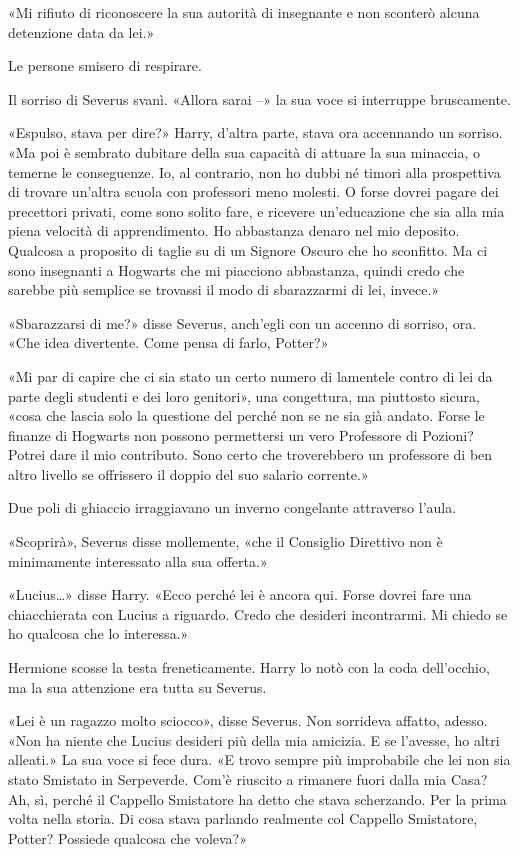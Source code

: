 «Mi rifiuto di riconoscere la sua autorità di insegnante e non sconterò alcuna detenzione data da lei.»

Le persone smisero di respirare.

Il sorriso di Severus svanì. «Allora sarai –» la sua voce si interruppe bruscamente.

«Espulso, stava per dire?» Harry, d’altra parte, stava ora accennando un sorriso. «Ma poi è sembrato dubitare della sua capacità di attuare la sua minaccia, o temerne le conseguenze. Io, al contrario, non ho dubbi né timori alla prospettiva di trovare un’altra scuola con professori meno molesti. O forse dovrei pagare dei precettori privati, come sono solito fare, e ricevere un’educazione che sia alla mia piena velocità di apprendimento. Ho abbastanza denaro nel mio deposito. Qualcosa a proposito di taglie su di un Signore Oscuro che ho sconfitto. Ma ci sono insegnanti a Hogwarts che mi piacciono abbastanza, quindi credo che sarebbe più semplice se trovassi il modo di sbarazzarmi di lei, invece.»

«Sbarazzarsi di me?» disse Severus, anch’egli con un accenno di sorriso, ora. «Che idea divertente. Come pensa di farlo, Potter?»

«Mi par di capire che ci sia stato un certo numero di lamentele contro di lei da parte degli studenti e dei loro genitori», una congettura, ma piuttosto sicura, «cosa che lascia solo la questione del perché non se ne sia già andato. Forse le finanze di Hogwarts non possono permettersi un vero Professore di Pozioni? Potrei dare il mio contributo. Sono certo che troverebbero un professore di ben altro livello se offrissero il doppio del suo salario corrente.»

Due poli di ghiaccio irraggiavano un inverno congelante attraverso l’aula.

«Scoprirà», Severus disse mollemente, «che il Consiglio Direttivo non è minimamente interessato alla sua offerta.»

«Lucius…» disse Harry. «Ecco perché lei è ancora qui. Forse dovrei fare una chiacchierata con Lucius a riguardo. Credo che desideri incontrarmi. Mi chiedo se ho qualcosa che lo interessa.»

Hermione scosse la testa freneticamente. Harry lo notò con la coda dell’occhio, ma la sua attenzione era tutta su Severus.

«Lei è un ragazzo molto sciocco», disse Severus. Non sorrideva affatto, adesso. «Non ha niente che Lucius desideri più della mia amicizia. E se l’avesse, ho altri alleati.» La sua voce si fece dura. «E trovo sempre più improbabile che lei non sia stato Smistato in Serpeverde. Com’è riuscito a rimanere fuori dalla mia Casa? Ah, sì, perché il Cappello Smistatore ha detto che stava scherzando. Per la prima volta nella storia. Di cosa stava parlando realmente col Cappello Smistatore, Potter? Possiede qualcosa che voleva?»

